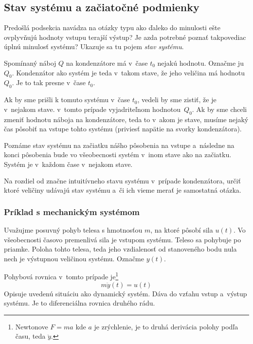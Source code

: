 \documentclass[a4paper, 10pt, ]{article}
\begin{document}
\subsection{Stav systému a začiatočné podmienky}


Predošlá podsekcia navádza na otázky typu ako ďaleko do minulosti ešte ovplyvňujú hodnoty vstupu terajší výstup? Je azda potrebné poznať takpovediac úplnú minulosť systému? Ukazuje sa tu pojem \emph{stav systému}.

Spomínaný náboj $Q$ na kondenzátore má v~čase $t_0$ nejakú hodnotu. Označme ju~$Q_0$. Kondenzátor ako systém je teda v~takom stave, že jeho veličina má hodnotu~$Q_0$. Je to tak presne v~čase $t_0$. 

Ak by sme prišli k tomuto systému v~čase $t_0$, vedeli by sme zistiť, že je v~nejakom stave. v~tomto prípade vyjadriteľnom hodnotou~$Q_0$. Ak by sme chceli zmeniť hodnotu náboja na kondenzátore, teda to v~akom je stave, musíme nejaký čas pôsobiť na vstupe tohto systému (priviesť napätie na svorky kondenzátora).

Poznáme stav systému na začiatku nášho pôsobenia na vstupe a~následne na konci pôsobenia bude vo všeobecnosti systém v~inom stave ako na začiatku. Systém je v~každom čase v~nejakom stave.

Na rozdiel od značne intuitívneho stavu systému v~prípade kondenzátora, určiť ktoré veličiny udávajú stav systému a~či ich vieme merať je samostatná otázka.



\subsubsection{Príklad s mechanickým systémom}


Uvažujme posuvný pohyb telesa s hmotnosťou $m$, na ktoré pôsobí sila $u(t)$. Vo všeobecnosti časovo premenlivá sila je vstupom systému. Teleso sa pohybuje po priamke. Poloha tohto telesa, teda jeho vzdialenosť od stanoveného bodu nula nech je výstupnou veličinou systému. Označme $y(t)$.

\begin{center}

    \vbox{%
        \makebox[\textwidth][c]{%
        
        }
    }
	\label{mechTeleso}

\end{center}

Pohybová rovnica v~tomto prípade je\footnote{Newtonove $F = ma$ kde $a$ je zrýchlenie, je to druhá derivácia polohy podľa času, teda $\ddot y$.}
\begin{equation} \label{pohybr}
    m \ddot y(t) = u(t)
\end{equation}
Opisuje uvedenú situáciu ako dynamický systém. Dáva do vzťahu vstup a~výstup systému. Je to diferenciálna rovnica druhého rádu.
\end{document}
